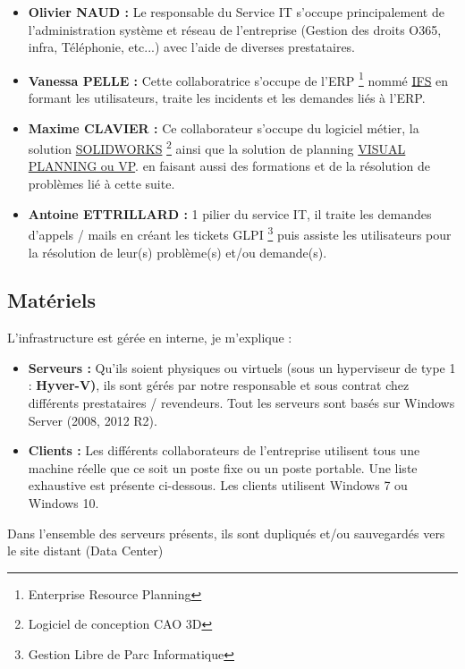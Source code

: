 \documentclass[11pt,a4paper,twoside]{article}
\begin{document}
\begin{itemize}
    \item \textbf{Olivier NAUD :} Le responsable du Service IT s'occupe principalement de l'administration système et réseau de l'entreprise (Gestion des droits O365, infra, Téléphonie, etc...) avec l'aide de diverses prestataires. \\
    \item \textbf{Vanessa PELLE :} Cette collaboratrice s'occupe de l'ERP \footnote{Enterprise Resource Planning} nommé \hyperlink{https://www.ifsworld.com/fr/}{IFS} en formant les utilisateurs, traite les incidents et les demandes liés à l'ERP. \\
    \item \textbf{Maxime CLAVIER :} Ce collaborateur s'occupe du logiciel métier, la solution \hyperlink{https://www.solidworks.com/fr}{SOLIDWORKS} \footnote{Logiciel de conception CAO 3D} ainsi que la solution de planning \hyperlink{https://www.visual-planning.com/fr/}{VISUAL PLANNING ou VP}. en faisant aussi des formations et de la résolution de problèmes lié à cette suite.\\
    \item \textbf{Antoine ETTRILLARD :} 1\ier{} pilier du service IT, il traite les demandes d'appels / mails en créant les tickets GLPI \footnote{Gestion Libre de Parc Informatique} puis assiste les utilisateurs pour la résolution de leur(s) problème(s) et/ou demande(s).
\end{itemize}
   
\subsection{Matériels}
L'infrastructure est gérée en interne, je m'explique :

\begin{itemize}
    \item \textbf{Serveurs :} Qu'ils soient physiques ou virtuels (sous un hyperviseur de type 1 : \textbf{Hyver-V)}, ils sont gérés par notre responsable et sous contrat chez différents prestataires / revendeurs. Tout les serveurs sont basés sur Windows Server (2008, 2012 R2).\\
    \item \textbf{Clients :} Les différents collaborateurs de l'entreprise utilisent tous une machine réelle que ce soit un poste fixe ou un poste portable. Une liste exhaustive est présente ci-dessous. Les clients utilisent Windows 7 ou Windows 10. \\
\end{itemize}
Dans l'ensemble des serveurs présents, ils sont dupliqués et/ou sauvegardés vers le site distant (Data Center) 
    
\end{document}
